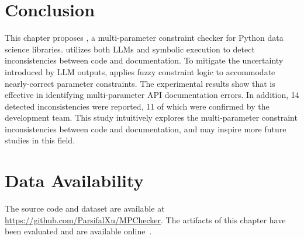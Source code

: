 \section{Conclusion}\label{sec:conclusion-mpchecker}

This chapter proposes \toolchecker, a multi-parameter constraint checker for Python data science libraries. \toolchecker utilizes both LLMs and symbolic execution to detect inconsistencies between code and documentation.
To mitigate the uncertainty introduced by LLM outputs, \toolchecker applies fuzzy constraint logic to accommodate nearly-correct parameter constraints. The experimental results show that \toolchecker is effective in identifying multi-parameter API documentation errors. In addition, 14 detected inconsistencies were reported, 11 of which were confirmed by the development team.
This study intuitively explores the multi-parameter constraint inconsistencies between code and documentation, and may inspire more future studies in this field.


\section{Data Availability}
The source code and dataset are available at \url{https://github.com/ParsifalXu/MPChecker}. The artifacts of this chapter have been evaluated and are available online~\cite{zenodo}.


